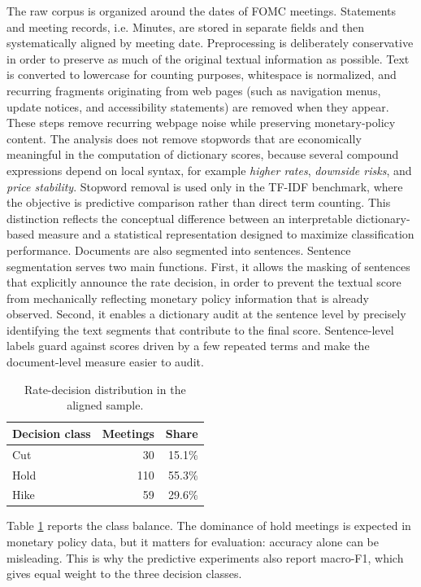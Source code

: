 \documentclass{article}
\begin{document}
The raw corpus is organized around the dates of FOMC meetings. Statements and meeting records, i.e. Minutes, are stored in separate fields and then systematically aligned by meeting date. 
Preprocessing is deliberately conservative in order to preserve as much of the original textual information as possible. Text is converted to lowercase for counting purposes, whitespace is normalized, and recurring fragments 
originating from web pages (such as navigation menus, update notices, and accessibility statements) are removed when they appear. These steps remove recurring webpage noise while preserving monetary-policy content.
The analysis does not remove stopwords that are economically meaningful in the computation of dictionary scores, because several compound expressions depend on local syntax, for example \textit{higher rates}, \textit{downside risks}, 
and \textit{price stability}. Stopword removal is used only in the TF-IDF benchmark, where the objective is predictive comparison rather than direct term counting. This distinction reflects the conceptual difference between an 
interpretable dictionary-based measure and a statistical representation designed to maximize classification performance.
Documents are also segmented into sentences. Sentence segmentation serves two main functions. First, it allows the masking of sentences that explicitly announce the rate decision, in order to prevent the textual score from 
mechanically reflecting monetary policy information that is already observed. Second, it enables a dictionary audit at the sentence level by precisely identifying the text segments that contribute to the final score. 
Sentence-level labels guard against scores driven by a few repeated terms and make the document-level measure easier to audit.

\begin{table}[t]
\centering
\caption{Rate-decision distribution in the aligned sample.}
\label{tab:decisions_sample}
\begin{tabular}{lrr}
\toprule
Decision class & Meetings & Share \\
\midrule
Cut & 30 & 15.1\% \\
Hold & 110 & 55.3\% \\
Hike & 59 & 29.6\% \\
\bottomrule
\end{tabular}
\end{table}

Table \ref{tab:decisions_sample} reports the class balance. The dominance of
hold meetings is expected in monetary policy data, but it matters for evaluation:
accuracy alone can be misleading. This is why the predictive experiments also
report macro-F1, which gives equal weight to the three decision classes.
\end{document}
